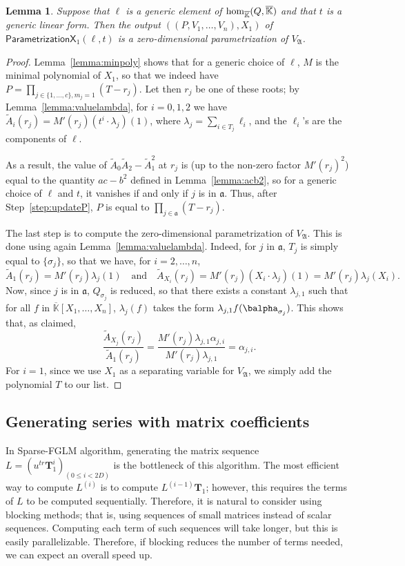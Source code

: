 \documentclass[12pt]{article}
\newtheorem{Lemma}{Lemma}
\def\Kbar {{\ensuremath{\overline{\mathbb{K}}}}}
\def\mT{\mathbf{T}}
\begin{document}
\begin{Lemma}
	Suppose that $\ell$ is a generic element of ${\rm
		hom}_{\Kbar}(Q,\Kbar)$ and that $t$ is a generic linear form. Then
	the output $((P,V_1,\dots,V_n),X_1)$ of
	$\mathsf{ParametrizationX}_1(\ell,t)$ is a zero-dimensional
	parametrization of $V_{\mathfrak{A}}$.
\end{Lemma}
\begin{proof}
	Lemma~\ref{lemma:minpoly} shows that for a generic choice of $\ell$,
	$M$ is the minimal polynomial of $X_1$, so that we indeed have
	$P=\prod_{j \in \{1,\dots,c\}, m_j=1} (T-r_j)$. Let then $r_j$ be
	one of these roots; by Lemma~\ref{lemma:valuelambda}, for $i=0,1,2$
	we have $\tilde A_i(r_j) = M'(r_j) (t^i \cdot \lambda_j)(1)$, where
	$\lambda_j =\sum_{i \in T_j} \ell_i$, and the $\ell_i$'s are the
	components of $\ell$. 
	
	As a result, the value of $\tilde A_0 \tilde A_2 - \tilde A_1^2$ at
	$r_j$ is (up to the non-zero factor $M'(r_j)^2$) equal to the
	quantity $ac-b^2$ defined in Lemma~\ref{lemma:acb2}, so for a
	generic choice of $\ell$ and $t$, it vanishes if and only if $j$ is
	in $\mathfrak{a}$. Thus, after Step~\ref{step:updateP}, 
	$P$ is equal to $\prod_{j \in \mathfrak{a}} (T-r_j)$.
	
	The last step is to compute the zero-dimensional parametrization of
	$V_{\mathfrak{A}}$. This is done using again
	Lemma~\ref{lemma:valuelambda}. Indeed, for $j$ in $\mathfrak{a}$, 
	$T_j$ is simply equal to $\{\sigma_j\}$, so that we have, for $i=2,\dots,n$,
	$$\tilde A_1(r_j)=M'(r_j) \lambda_j(1) \quad\text{and}\quad \tilde
	A_{X_i}(r_j) = M'(r_j) (X_i \cdot \lambda_j)(1) = M'(r_j) \lambda_j(X_i).$$ Now, since $j$
	is in $\mathfrak{a}$, $Q_{\sigma_j}$ is reduced, so that there
	exists a constant $\lambda_{j,1}$ such that for all $f$ in
	$\Kbar[X_1,\dots,X_n]$, $\lambda_j(f)$ takes the form $\lambda_{j,1}
	f(\balpha_{\sigma_j})$. This shows that, as claimed,
	$$\frac{\tilde A_{X_j}(r_j)}{\tilde A_1 (r_j)} = \frac
	{M'(r_j) \lambda_{j,1} \alpha_{j,i}}{M'(r_j) \lambda_{j,1}} = \alpha_{j,i}.$$
	For $i=1$, since we use $X_1$ as a separating variable for $V_{\mathfrak{A}}$, 
	we simply add the polynomial $T$ to our list.
\end{proof}


\subsection{Generating series with matrix coefficients}
In Sparse-FGLM algorithm, generating the matrix sequence 
$L = (u^{tr} \mT_1^i)_{(0 \le i < 2D)}$ is the bottleneck of this
algorithm. The most efficient way to compute $L^{(i)}$ is
to compute $L^{(i-1)}\mT_1$; however, this requires the terms
of $L$ to be computed sequentially. Therefore, it is natural to
consider using blocking methods; that is, using
sequences of small matrices instead of scalar
sequences. Computing each
term of such sequences will take longer, but this is easily
parallelizable. Therefore, if blocking reduces the number of terms
needed, we can expect an overall speed up.
\end{document}
